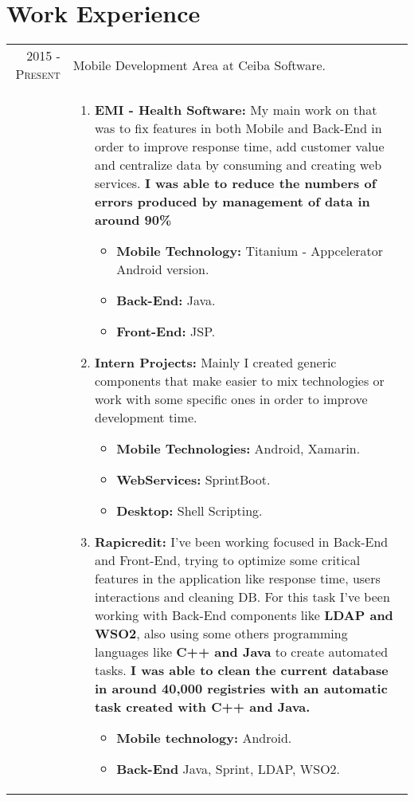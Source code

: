 \documentclass[a4paper,10pt]{article} %
\begin{document}
\section{Work Experience}

\begin{tabular}{r|p{11cm}}

\textsc{2015 - Present} & Mobile Development Area at Ceiba Software.\\
& \footnotesize{
\begin{enumerate}
\item \textbf{EMI - Health Software:} My main work on that was to fix features in both Mobile and Back-End in order to improve response time, add customer value and centralize data by consuming and creating web services. \textbf{I was able to reduce the numbers of errors produced by management of data in around 90\%}
\begin{itemize}
\item \textbf{Mobile Technology:} Titanium - Appcelerator Android version.
\item \textbf{Back-End:} Java.
\item \textbf{Front-End:} JSP.
\end{itemize}
\item \textbf{Intern Projects:} Mainly I created generic components that make easier to mix technologies or work with some specific ones in order to improve development time.
\begin{itemize}
\item \textbf{Mobile Technologies:} Android, Xamarin.
\item \textbf{WebServices:} SprintBoot.
\item \textbf{Desktop:} Shell Scripting.
\end{itemize}
\item \textbf{Rapicredit:} I've been working focused in Back-End and Front-End, trying to optimize some critical features in the application like response time, users interactions and cleaning DB. For this task I've been working with Back-End components like \textbf{LDAP and WSO2}, also using some others programming languages like \textbf{C++ and Java} to create automated tasks. \textbf{I was able to clean the current database in around 40,000 registries with an automatic task created with C++ and Java.}
\begin{itemize}
\item \textbf{Mobile technology:} Android.
\item \textbf{Back-End} Java, Sprint, LDAP, WSO2.

\end{itemize}
\end{enumerate}}
\end{tabular}
\end{document}
